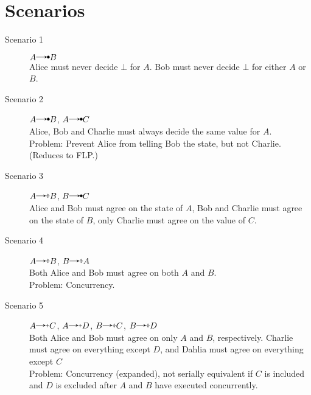 \documentclass{article}
\begin{document}
	\section*{Scenarios} %
	\begin{description}
		\item[Scenario 1] 
			$A\crel B$\\
			Alice must never decide $\bot$ for $A$. Bob must never decide $\bot$ for either $A$ or $B$.
		\item[Scenario 2]
			$A\crel B$, $A\crel C$\\
			Alice, Bob and Charlie must always decide the same value for $A$.\\
			Problem: Prevent Alice from telling Bob the state, but not Charlie. (Reduces to FLP.)
		\item[Scenario 3]
			$A\erel B$, $B\crel C$\\
			Alice and Bob must agree on the state of $A$, Bob and Charlie must agree on the state of $B$, only Charlie must agree on the value of $C$.
		\item[Scenario 4]
			$A\erel B$, $B\erel A$\\
			Both Alice and Bob must agree on both $A$ and $B$.\\
			Problem: Concurrency.
		\item[Scenario 5]
			$A\irel C$, $A\irel D$, $B\erel C$, $B\erel D$\\
			Both Alice and Bob must agree on only $A$ and $B$, respectively. Charlie must agree on everything except $D$, and Dahlia must agree on everything except $C$\\
			Problem: Concurrency (expanded), not serially equivalent if $C$ is included and $D$ is excluded after $A$ and $B$ have executed concurrently.			
	\end{description}
\end{document}

